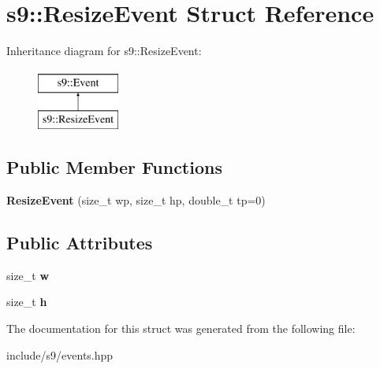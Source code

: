 \hypertarget{structs9_1_1ResizeEvent}{\section{s9\-:\-:\-Resize\-Event \-Struct \-Reference}
\label{structs9_1_1ResizeEvent}
}
\-Inheritance diagram for s9\-:\-:\-Resize\-Event\-:\begin{figure}[H]
\begin{center}
\leavevmode
\includegraphics[height=2.000000cm]{structs9_1_1ResizeEvent}
\end{center}
\end{figure}
\subsection*{\-Public \-Member \-Functions}
\begin{DoxyCompactItemize}
\item 
\hypertarget{structs9_1_1ResizeEvent_a951885563e1fffa3c84691feb0ffe430}{{\bfseries \-Resize\-Event} (size\-\_\-t wp, size\-\_\-t hp, double\-\_\-t tp=0)}\label{structs9_1_1ResizeEvent_a951885563e1fffa3c84691feb0ffe430}

\end{DoxyCompactItemize}
\subsection*{\-Public \-Attributes}
\begin{DoxyCompactItemize}
\item 
\hypertarget{structs9_1_1ResizeEvent_a3d550f893627c92f770895e2b03572fd}{size\-\_\-t {\bfseries w}}\label{structs9_1_1ResizeEvent_a3d550f893627c92f770895e2b03572fd}

\item 
\hypertarget{structs9_1_1ResizeEvent_ac0e84e02ec037d1bbbd206a276365e27}{size\-\_\-t {\bfseries h}}\label{structs9_1_1ResizeEvent_ac0e84e02ec037d1bbbd206a276365e27}

\end{DoxyCompactItemize}


\-The documentation for this struct was generated from the following file\-:\begin{DoxyCompactItemize}
\item 
include/s9/events.\-hpp\end{DoxyCompactItemize}
